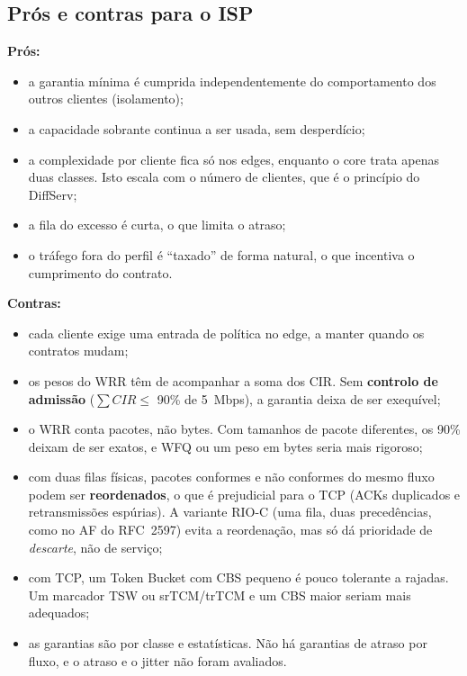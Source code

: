 \IfFileExists{llncs.cls}{\documentclass[runningheads]{llncs}}{\documentclass{article}}
\begin{document}
\subsection{Prós e contras para o ISP}
\textbf{Prós:}
\begin{itemize}
\item a garantia mínima é cumprida independentemente do comportamento dos outros clientes
(isolamento);
\item a capacidade sobrante continua a ser usada, sem desperdício;
\item a complexidade por cliente fica só nos edges, enquanto o core trata apenas duas
classes. Isto escala com o número de clientes, que é o princípio do DiffServ;
\item a fila do excesso é curta, o que limita o atraso;
\item o tráfego fora do perfil é ``taxado'' de forma natural, o que incentiva o cumprimento
do contrato.
\end{itemize}

\textbf{Contras:}
\begin{itemize}
\item cada cliente exige uma entrada de política no edge, a manter quando os contratos
mudam;
\item os pesos do WRR têm de acompanhar a soma dos CIR. Sem \textbf{controlo de admissão}
($\sum CIR\le$ 90\% de 5~Mbps), a garantia deixa de ser exequível;
\item o WRR conta pacotes, não bytes. Com tamanhos de pacote diferentes, os 90\% deixam de
ser exatos, e WFQ ou um peso em bytes seria mais rigoroso;
\item com duas filas físicas, pacotes conformes e não conformes do mesmo fluxo podem ser
\textbf{reordenados}, o que é prejudicial para o TCP (ACKs duplicados e retransmissões
espúrias). A variante RIO-C (uma fila, duas precedências, como no AF do RFC~2597) evita a
reordenação, mas só dá prioridade de \emph{descarte}, não de serviço;
\item com TCP, um Token Bucket com CBS pequeno é pouco tolerante a rajadas. Um marcador TSW
ou srTCM/trTCM e um CBS maior seriam mais adequados;
\item as garantias são por classe e estatísticas. Não há garantias de atraso por fluxo, e o
atraso e o jitter não foram avaliados.
\end{itemize}

\end{document}
